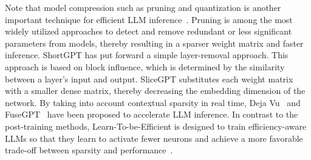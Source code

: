 Note that model compression such as pruning and quantization is another important technique for efficient LLM inference~\cite{lin2024awq,pei2023quantization,zou2024bie,lin2024qserve}. Pruning is among the most widely utilized approaches to detect and remove redundant or less significant parameters from models, thereby resulting in a sparser weight matrix and faster inference. ShortGPT \cite{shortgpt} has put forward a simple layer-removal approach. This approach is based on block influence, which is determined by the similarity between a layer's input and output. SliceGPT \cite{slicegpt} substitutes each weight matrix with a smaller dense matrix, thereby decreasing the embedding dimension of the network. By taking into account contextual sparsity in real time, Deja Vu~\cite{dejavu} and FuseGPT~\cite{fusegpt} have been proposed to accelerate LLM inference. In contrast to the post-training methods, Learn-To-be-Efficient is designed to train efficiency-aware LLMs so that they learn to activate fewer neurons and achieve a more favorable trade-off between sparsity and performance~\cite{learn}. 